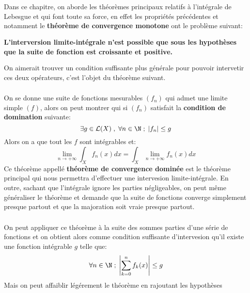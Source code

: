\chapter*{} %

Dans ce chapitre, on aborde les théorèmes principaux relatifs à l'intégrale de Lebesgue et qui font toute sa force, en effet les propriétés précédentes et notamment le \textbf{théorème de convergence monotone} ont le problème suivant:
\begin{center}
   \textbf{L'interversion limite-intégrale n'est possible que sous les hypothèses que la suite de fonction est croissante et positive.}
\end{center}
On aimerait trouver un condition suffisante plus générale pour pouvoir intervetir ces deux opérateurs, c'est l'objet du théorème suivant.

\subsection*{}
On se donne une suite de fonctions mesurables \((f_n)\) qui admet une limite simple \((f)\), alors on peut montrer qui si \((f_n)\) satisfait la \textbf{condition de domination} suivante:
\[
   \exists g \in \mathcal{L}(X) \; , \; \forall n \in \N \; ; \; |f_n| \leq g
\]
Alors on a que tout les \(f\) sont intégrables et:
\[
   \lim_{n \rightarrow +\infty} \int_X f_n(x) dx = \int_X \lim_{n \rightarrow +\infty} f_n(x) dx
\]
Ce théorème appellé \textbf{théorème de convergence dominée} est le théorème principal qui nous permettra d'effectuer une intervesion limite-intégrale. En outre, sachant que l'intégrale ignore les parties négligeables, on peut même généraliser le théorème et demande que la suite de fonctions converge simplement presque partout et que la majoration soit vraie presque partout.

\subsection*{}
On peut appliquer ce théorème à la suite des sommes parties d'une série de fonctions et on obtient alors comme condition suffisante d'intervesion qu'il existe une fonction intégrable \(g\) telle que:
\[
   \forall n \in \N \; ; \; \left|\sum_{k=0}^{n} f_k(x)\right| \leq g
\]
Mais on peut affaiblir légérement le théorème en rajoutant les hypothèses 

